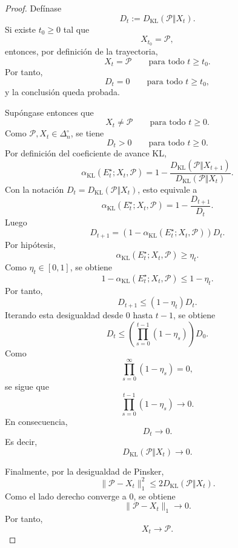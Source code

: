﻿\documentclass[12pt]{article}
\begin{document}
\begin{proof}
Defínase
\[
D_t:=D_{\mathrm{KL}}(\mathcal P\Vert X_t).
\]
Si existe \(t_0\geq 0\) tal que
\[
X_{t_0}=\mathcal P,
\]
entonces, por definición de la trayectoria,
\[
X_t=\mathcal P
\qquad
\text{para todo }t\geq t_0.
\]
Por tanto,
\[
D_t=0
\qquad
\text{para todo }t\geq t_0,
\]
y la conclusión queda probada.

Supóngase entonces que
\[
X_t\neq \mathcal P
\qquad
\text{para todo }t\geq 0.
\]
Como \(\mathcal P,X_t\in\Delta_n^\circ\), se tiene
\[
D_t>0
\qquad
\text{para todo }t\geq 0.
\]
Por definición del coeficiente de avance KL,
\[
\alpha_{\mathrm{KL}}(E_t^\star;X_t,\mathcal P)
=
1-
\frac{
D_{\mathrm{KL}}(\mathcal P\Vert X_{t+1})
}{
D_{\mathrm{KL}}(\mathcal P\Vert X_t)
}.
\]
Con la notación \(D_t=D_{\mathrm{KL}}(\mathcal P\Vert X_t)\), esto equivale a
\[
\alpha_{\mathrm{KL}}(E_t^\star;X_t,\mathcal P)
=
1-\frac{D_{t+1}}{D_t}.
\]
Luego
\[
D_{t+1}
=
\left(
1-\alpha_{\mathrm{KL}}(E_t^\star;X_t,\mathcal P)
\right)D_t.
\]
Por hipótesis,
\[
\alpha_{\mathrm{KL}}(E_t^\star;X_t,\mathcal P)\geq \eta_t.
\]
Como \(\eta_t\in[0,1]\), se obtiene
\[
1-\alpha_{\mathrm{KL}}(E_t^\star;X_t,\mathcal P)
\leq
1-\eta_t.
\]
Por tanto,
\[
D_{t+1}
\leq
(1-\eta_t)D_t.
\]
Iterando esta desigualdad desde \(0\) hasta \(t-1\), se obtiene
\[
D_t
\leq
\left(
\prod_{s=0}^{t-1}(1-\eta_s)
\right)D_0.
\]
Como
\[
\prod_{s=0}^{\infty}(1-\eta_s)=0,
\]
se sigue que
\[
\prod_{s=0}^{t-1}(1-\eta_s)\longrightarrow 0.
\]
En consecuencia,
\[
D_t\longrightarrow 0.
\]
Es decir,
\[
D_{\mathrm{KL}}(\mathcal P\Vert X_t)\longrightarrow 0.
\]

Finalmente, por la desigualdad de Pinsker,
\[
\|\mathcal P-X_t\|_1^2
\leq
2D_{\mathrm{KL}}(\mathcal P\Vert X_t).
\]
Como el lado derecho converge a \(0\), se obtiene
\[
\|\mathcal P-X_t\|_1\longrightarrow 0.
\]
Por tanto,
\[
X_t\longrightarrow \mathcal P.
\]
\end{proof}
\end{document}
